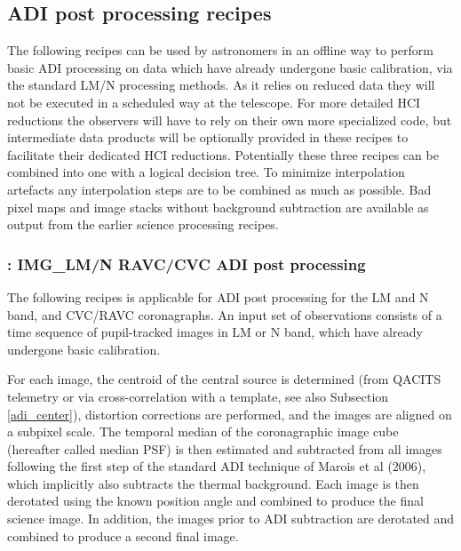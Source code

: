 
\subsection{ADI post processing recipes}
\label{ssec:ADI_postprocessing}



The following recipes can be used by astronomers in an offline way to
perform basic ADI processing on data which have already undergone
basic calibration, via the standard LM/N processing methods.  As it
relies on reduced data they will not be executed in a scheduled way at
the telescope. For more detailed HCI reductions the observers will
have to rely on their own more specialized code, but intermediate data
products will be optionally provided in these recipes to facilitate
their dedicated HCI reductions. Potentially these three recipes can be combined into one with a logical decision tree. To minimize interpolation artefacts any interpolation steps are to be combined as much as possible. Bad pixel maps and image stacks without background subtraction are available as output from the earlier science processing recipes.

\subsubsection{: IMG\_LM/N RAVC/CVC ADI post processing}
\label{sssec:adi_img_vc}


The following recipes is applicable for ADI post processing for the LM
and N band, and CVC/RAVC coronagraphs. An input set of
observations consists of a time sequence of pupil-tracked images in LM or N
band, which have already undergone basic calibration. 

For each image, the centroid of the central source is determined (from QACITS telemetry or via cross-correlation with a template, see also Subsection \ref{adi_center}),
distortion corrections are performed, and the images are aligned on a
subpixel scale. The temporal median of the coronagraphic image cube (hereafter called median PSF) is then estimated and subtracted from
all images following the first step of the standard ADI technique of
Marois et al (2006), which implicitly also subtracts the thermal background.
Each image is then derotated using the known
position angle and combined to produce the final science image. In
addition, the images prior to ADI subtraction are derotated and
combined to produce a second final image.


